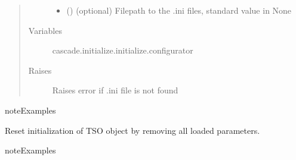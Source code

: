 \documentclass[a4paper,10pt,english]{sphinxmanual}
\begin{document}
\begin{fulllineitems}
\begin{fulllineitems}
\begin{quote}
\begin{description}
\begin{itemize}
\item {} 
 () \textendash{} (optional) Filepath to the .ini files, standard value in None

\end{itemize}

\item[{Variables}] \leavevmode
{} \textendash{} cascade.initialize.initialize.configurator

\item[{Raises}] \leavevmode
{} \textendash{} Raises error if .ini file is not found

\end{description}\end{quote}

\begin{sphinxadmonition}{note}{Examples}

%
\begin{sphinxVerbatim}[commandchars=\\\{\}]
 
\end{sphinxVerbatim}
\end{sphinxadmonition}

\end{fulllineitems}


\begin{fulllineitems}
\label{\detokenize{cascade.TSO:cascade.TSO.TSO.TSOSuite.reset_TSO}}
Reset initialization of TSO object by removing all loaded parameters.

\begin{sphinxadmonition}{note}{Examples}

%
\begin{sphinxVerbatim}[commandchars=\\\{\}]
\end{sphinxVerbatim}
\end{sphinxadmonition}


\end{fulllineitems}
\end{fulllineitems}
\end{document}
